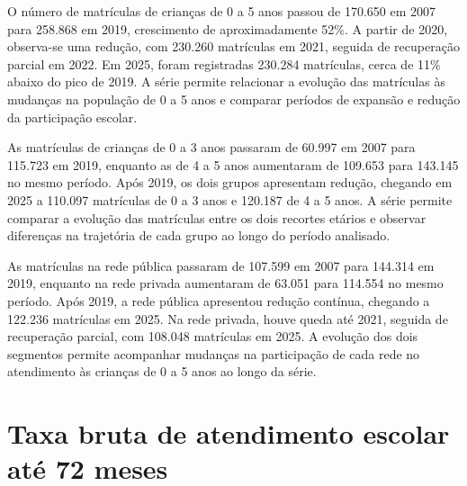 
O número de matrículas de crianças de 0 a 5 anos passou de 170.650 em 2007 para 258.868 em 2019, crescimento de aproximadamente 52\%. A partir de 2020, observa-se uma redução, com 230.260 matrículas em 2021, seguida de recuperação parcial em 2022. Em 2025, foram registradas 230.284 matrículas, cerca de 11\% abaixo do pico de 2019. A série permite relacionar a evolução das matrículas às mudanças na população de 0 a 5 anos e comparar períodos de expansão e redução da participação escolar.


As matrículas de crianças de 0 a 3 anos passaram de 60.997 em 2007 para 115.723 em 2019, enquanto as de 4 a 5 anos aumentaram de 109.653 para 143.145 no mesmo período. Após 2019, os dois grupos apresentam redução, chegando em 2025 a 110.097 matrículas de 0 a 3 anos e 120.187 de 4 a 5 anos. A série permite comparar a evolução das matrículas entre os dois recortes etários e observar diferenças na trajetória de cada grupo ao longo do período analisado.


As matrículas na rede pública passaram de 107.599 em 2007 para 144.314 em 2019, enquanto na rede privada aumentaram de 63.051 para 114.554 no mesmo período. Após 2019, a rede pública apresentou redução contínua, chegando a 122.236 matrículas em 2025. Na rede privada, houve queda até 2021, seguida de recuperação parcial, com 108.048 matrículas em 2025. A evolução dos dois segmentos permite acompanhar mudanças na participação de cada rede no atendimento às crianças de 0 a 5 anos ao longo da série.


\section{Taxa bruta de atendimento escolar até 72 meses}


